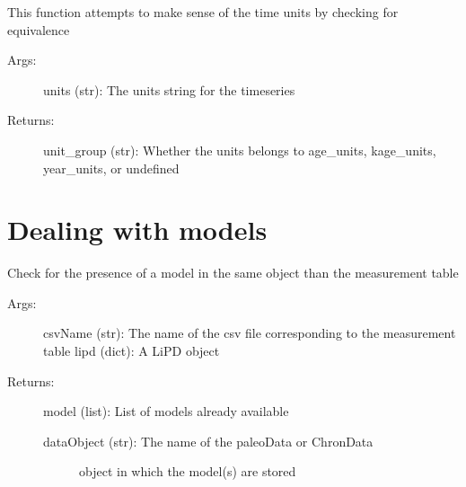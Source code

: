 \documentclass[letterpaper,10pt,english]{sphinxmanual}
\begin{document}

\begin{fulllineitems}
\label{\detokenize{LIPDutils:pyleoclim.LipdUtils.timeUnitsCheck}}
This function attempts to make sense of the time units by checking for equivalence
\begin{description}
\item[{Args:}] \leavevmode
units (str): The units string for the timeseries

\item[{Returns:}] \leavevmode
unit\_group (str): Whether the units belongs to age\_units, kage\_units, year\_units, or undefined

\end{description}

\end{fulllineitems}



\section{Dealing with models}
\label{\detokenize{LIPDutils:dealing-with-models}}

\begin{fulllineitems}
\label{\detokenize{LIPDutils:pyleoclim.LipdUtils.isModel}}
Check for the presence of a model in the same object than the measurement table
\begin{description}
\item[{Args:}] \leavevmode
csvName (str): The name of the csv file corresponding to the measurement table
lipd (dict): A LiPD object

\item[{Returns:}] \leavevmode
model (list): List of models already available
\begin{description}
\item[{dataObject (str): The name of the paleoData or ChronData}] \leavevmode
object in which the model(s) are stored

\end{description}

\end{description}

\end{fulllineitems}
\end{document}
